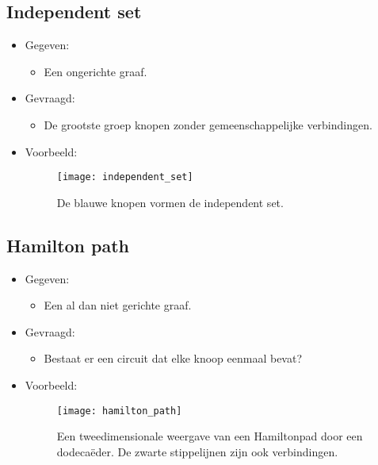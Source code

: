 \subsection{Independent set}
\begin{itemize}
    \item Gegeven:
    \begin{itemize}
        \item Een ongerichte graaf.
    \end{itemize}
    \item Gevraagd:
    \begin{itemize}
        \item De grootste groep knopen zonder gemeenschappelijke verbindingen.
    \end{itemize}
    \item Voorbeeld:
    \begin{figure}[ht]
        \centering
        \texttt{[image: independent\_set]}
        \caption{De blauwe knopen vormen de independent set.}
        \label{fig:independent_set}
    \end{figure}

\end{itemize}

\subsection{Hamilton path}
\begin{itemize}
    \item Gegeven:
    \begin{itemize}
        \item Een al dan niet gerichte graaf.
    \end{itemize}
    \item Gevraagd:
    \begin{itemize}
        \item Bestaat er een circuit dat elke knoop eenmaal bevat?
    \end{itemize}
    \item Voorbeeld:
    \begin{figure}[ht]
        \centering
        \texttt{[image: hamilton\_path]}
        \caption{Een tweedimensionale weergave van een Hamiltonpad door een dodecaëder. De zwarte stippelijnen zijn ook verbindingen.}
        \label{fig:hamilton_path}
    \end{figure}

\end{itemize}

